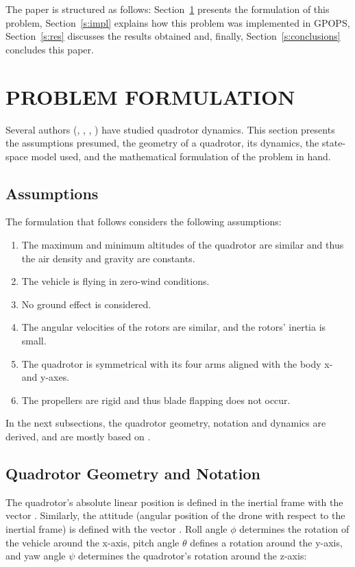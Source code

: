 \documentclass[letterpaper, 10 pt, conference]{ieeeconf}  %
\begin{document}
The paper is structured as follows: Section~\ref{s:problem} presents the formulation of this problem, Section~\ref{s:impl} explains how this problem was implemented in GPOPS, Section~\ref{s:res} discusses the results obtained and, finally, Section~\ref{s:conclusions} concludes this paper.


\section{PROBLEM FORMULATION}\label{s:problem}

Several authors (\cite{bouabdallah2007full}, \cite{chovancova2014mathematical}, \cite{luukkonen2011modelling}, \cite{beard2008quadrotor}) have studied quadrotor dynamics. This section presents the assumptions presumed, the geometry of a quadrotor, its dynamics, the state-space model used, and the mathematical formulation of the problem in hand.

\subsection{Assumptions}

The formulation that follows considers the following assumptions:
\begin{enumerate}
	\item The maximum and minimum altitudes of the quadrotor are similar and thus the air density and gravity are constants.
	\item The vehicle is flying in zero-wind conditions.
	\item No ground effect is considered.
	\item \label{as:Ir} The angular velocities of the rotors are similar, and the rotors' inertia is small.
	\item \label{as:inertia} The quadrotor is symmetrical with its four arms aligned with the body x- and y-axes.
	\item The propellers are rigid and thus blade flapping does not occur.
\end{enumerate}

In the next subsections, the quadrotor geometry, notation and dynamics are derived, and are mostly based on \cite{luukkonen2011modelling}.

\subsection{Quadrotor Geometry and Notation}

The quadrotor's absolute linear position is defined in the inertial frame with the vector \bm{$\xi$}. Similarly, the attitude (angular position of the drone with respect to the inertial frame) is defined with the vector \bm{$\eta$}. Roll angle $\phi$ determines the rotation of the vehicle around the x-axis, pitch angle $\theta$ defines a rotation around the y-axis, and yaw angle $\psi$ determines the quadrotor's rotation around the z-axis:
\end{document}
